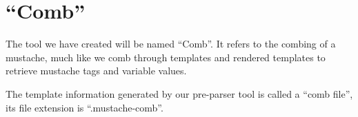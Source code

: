 \documentclass[thesis.tex]{subfiles}
\begin{document}
\section{``Comb''}
The tool we have created will be named ``Comb''. It refers to the combing of
a mustache, much like we comb through templates and rendered templates to
retrieve mustache tags and variable values.

The template information generated by our pre-parser tool is called a
``comb file'', its file extension is ``.mustache-comb''.
\end{document}
